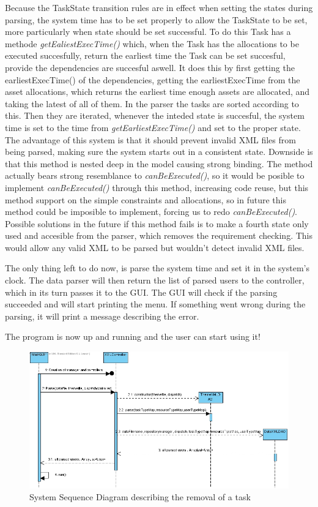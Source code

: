 			Because the TaskState transition rules are in effect when setting the states during parsing, the system time has to be set properly to allow the TaskState to be set, more particularly when state should be set successful. To do this Task has a methode \emph{getEaliestExecTime()} which, when the Task has the allocations to be executed succesfully, return the earliest time the Task can be set succesful, provide the dependencies are succesful aswell. It does this by first getting the earliestExecTime() of the dependencies, getting the earliestExecTime from the asset allocations, which returns the earliest time enough assets are allocated, and taking the latest of all of them. In the parser the tasks are sorted according to this. Then they are iterated, whenever the inteded state is succesful, the system time is set to the time from \emph{getEarliestExecTime()} and set to the proper state. The advantage of this system is that it should prevent invalid XML files from being parsed, making sure the system starts out in a consistent state. Downside  is that this method is nested deep in the model causing strong binding. The method actually bears strong resemblance to \emph{canBeExecuted()}, so it would be posible to implement \emph{canBeExecuted()} through this method, increasing code reuse, but this method support on the simple constraints and allocations, so in future this method could be imposible to implement, forcing us to redo \emph{canBeExecuted()}. Possible solutions in the future if this method fails is to make a fourth state only used and accesible from the parser, which removes the requirement checking. This would allow any valid XML to be parsed but wouldn't detect invalid XML files.
			
			The only thing left to do now, is parse the system time and set it in the system's clock. The data parser will then return the list of parsed users to the controller, which in its turn passes it to the GUI. The GUI will check if the parsing succeeded and will start printing the menu. If something went wrong during the parsing, it will print a message describing the error.
			
			The program is now up and running and the user can start using it!
			
			\begin{figure}[H]
				\begin{center}
					\includegraphics[scale=0.5]{images/System_Initiation.jpg}
				\end{center}
				\caption{System Sequence Diagram describing the removal of a task}
			\end{figure}

